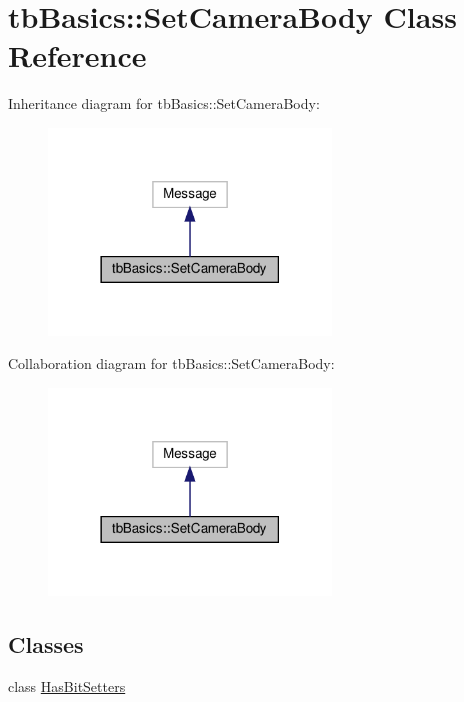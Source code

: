 \hypertarget{classtbBasics_1_1SetCameraBody}{}\section{tb\+Basics\+:\+:Set\+Camera\+Body Class Reference}
\label{classtbBasics_1_1SetCameraBody}


Inheritance diagram for tb\+Basics\+:\+:Set\+Camera\+Body\+:
\nopagebreak
\begin{figure}[H]
\begin{center}
\leavevmode
\includegraphics[width=213pt]{classtbBasics_1_1SetCameraBody__inherit__graph}
\end{center}
\end{figure}


Collaboration diagram for tb\+Basics\+:\+:Set\+Camera\+Body\+:
\nopagebreak
\begin{figure}[H]
\begin{center}
\leavevmode
\includegraphics[width=213pt]{classtbBasics_1_1SetCameraBody__coll__graph}
\end{center}
\end{figure}
\subsection*{Classes}
\begin{DoxyCompactItemize}
\item 
class \hyperlink{classtbBasics_1_1SetCameraBody_1_1HasBitSetters}{Has\+Bit\+Setters}
\end{DoxyCompactItemize}
